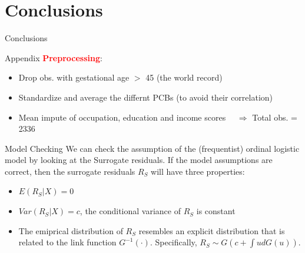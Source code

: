 \documentclass{beamer}\usepackage[]{graphicx}\usepackage[]{color}
\begin{document}
\section{Conclusions}
\begin{frame}{Conclusions}
\end{frame}

\appendix
\begin{frame}{Appendix}
\textcolor{red}{\textbf{Preprocessing}}:
{\small
\begin{itemize}
\item Drop obs. with gestational age $>$ 45 (the world record)
\item Standardize and average the differnt PCBs (to avoid their correlation)
\item Mean impute of occupation, education and income scores 
$\quad \Longrightarrow$ Total obs. = 2336
\end{itemize}}
\end{frame}

\begin{frame}{Model Checking}
We can check the assumption of the (frequentist) ordinal logistic model by looking at the Surrogate residuals.
If the model assumptions are correct, then the surrogate residuals $R_S$ will have three properties:
\begin{itemize}
 \item $E(R_S|X)=0$
 \item $Var(R_S|X)=c$, the conditional variance of $R_S$ is constant
 \item The emiprical distribution of $R_S$ resembles an explicit distribution that is related to the link function $G^{-1}(\cdot)$. Specifically, $R_S\sim G(c+\int ud G(u))$.
\end{itemize}
\end{frame}
\end{document}
